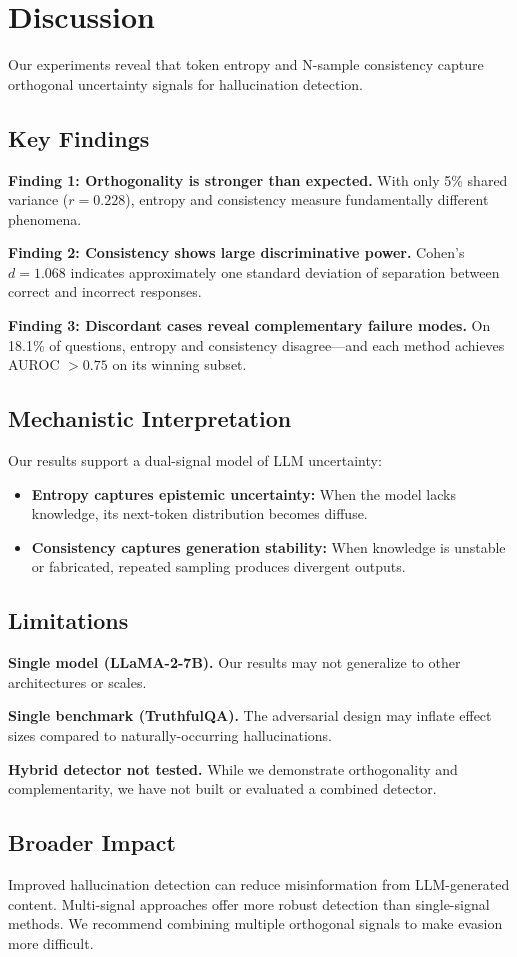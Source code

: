 \section{Discussion}
\label{sec:discussion}

Our experiments reveal that token entropy and N-sample consistency capture orthogonal uncertainty signals for hallucination detection.

\subsection{Key Findings}

\textbf{Finding 1: Orthogonality is stronger than expected.} With only 5\% shared variance ($r = 0.228$), entropy and consistency measure fundamentally different phenomena.

\textbf{Finding 2: Consistency shows large discriminative power.} Cohen's $d = 1.068$ indicates approximately one standard deviation of separation between correct and incorrect responses.

\textbf{Finding 3: Discordant cases reveal complementary failure modes.} On 18.1\% of questions, entropy and consistency disagree---and each method achieves AUROC $> 0.75$ on its winning subset.

\subsection{Mechanistic Interpretation}

Our results support a dual-signal model of LLM uncertainty:

\begin{itemize}
    \item \textbf{Entropy captures epistemic uncertainty:} When the model lacks knowledge, its next-token distribution becomes diffuse.
    \item \textbf{Consistency captures generation stability:} When knowledge is unstable or fabricated, repeated sampling produces divergent outputs.
\end{itemize}

\subsection{Limitations}

\textbf{Single model (LLaMA-2-7B).} Our results may not generalize to other architectures or scales.

\textbf{Single benchmark (TruthfulQA).} The adversarial design may inflate effect sizes compared to naturally-occurring hallucinations.

\textbf{Hybrid detector not tested.} While we demonstrate orthogonality and complementarity, we have not built or evaluated a combined detector.

\subsection{Broader Impact}

Improved hallucination detection can reduce misinformation from LLM-generated content. Multi-signal approaches offer more robust detection than single-signal methods. We recommend combining multiple orthogonal signals to make evasion more difficult.
